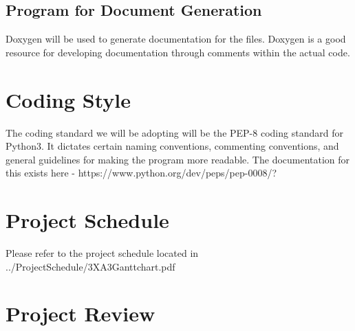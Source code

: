 \documentclass{article}
\begin{document}
\subsection{Program for Document Generation}
Doxygen will be used to generate documentation for the files. Doxygen is a good resource for developing documentation through comments within the actual code.

\section{Coding Style}
The coding standard we will be adopting will be the PEP-8 coding standard for Python3. It dictates certain naming conventions, commenting conventions, and general guidelines for making the program more readable. The documentation for this exists here  - https://www.python.org/dev/peps/pep-0008/?

\section{Project Schedule}

Please refer to the project schedule located in ../ProjectSchedule/3XA3Ganttchart.pdf

\section{Project Review}
\end{document}
